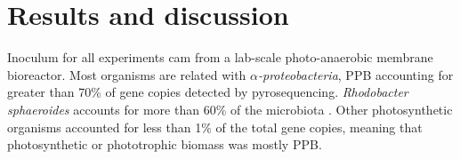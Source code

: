 \newpage
\section{Results and discussion}
Inoculum for all experiments cam from a lab-scale photo-anaerobic membrane bioreactor. Most organisms are related with $\alpha$\textit{-proteobacteria}, PPB accounting for greater than 70\% of gene copies detected by pyrosequencing. \textit{Rhodobacter sphaeroides} accounts for more than 60\% of the microbiota \cite{Hulsen2016}. Other photosynthetic organisms accounted for less than 1\% of the total gene copies, meaning that photosynthetic or phototrophic biomass was mostly PPB. 














